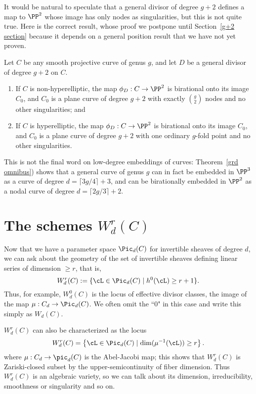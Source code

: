 It would be natural to speculate that a general divisor of degree $g+2$ defines a map to $\PP^2$ whose
image has only nodes as singularities, but this is not quite true. Here is the correct result,
whose proof we postpone until Section~\ref{g+2 section} because it depends on a general position result that we have not yet proven.

\begin{theorem}[$g+2$ theorem]\label{g+2 theorem}
Let $C$ be any smooth projective curve of genus $g$, and let $D$ be a general divisor of degree $g+2$ on $C$. 
\begin{enumerate}
\item If $C$ is non-hyperelliptic, the map $\phi_D : C \to \PP^2$ is birational onto its image $C_0$, and $C_0$ is a plane curve of degree $g+2$ with exactly $\binom{g}{2}$ nodes and no other singularities; and
\item If $C$ is hyperelliptic, the map $\phi_D : C \to \PP^2$ is birational onto its image $C_0$, and $C_0$ is a plane curve of degree $g+2$ with one ordinary $g$-fold point and no other singularities.
\end{enumerate}
\end{theorem}

This is not the final word on low-degree embeddings of curves: Theorem~\ref{grd omnibus}) shows that a general curve of genus $g$ can in fact be embedded in $\PP^{3}$ as a curve of degree $d = \lceil 3g/4 \rceil + 3$, and can be birationally embedded in $\PP^2$ as a nodal curve of degree $d = \lceil 2g/3 \rceil + 2$.

\section{The schemes $W^r_d(C)$}

Now that we have a parameter space $\Pic_d(C)$ for invertible sheaves of degree $d$, we can ask about the geometry of the set of invertible sheaves defining linear series of dimension $\geq r$, that is,
$$
W^r_d(C) := \{ \cL \in \Pic_d(C) \mid h^0(\cL) \geq r+1 \}.
$$
Thus, for example, $W^0_d(C)$ is the locus of effective divisor classes, the image of the map $\mu : C_d \to \Pic_d(C)$. We often omit the ``0" in this case and write this simply as $W_d(C)$.

$W^r_d(C)$ can also be characterized as the locus
$$
W^r_d(C) = \left\{ \cL \in \Pic_d(C) \mid \dim(\mu^{-1}(\cL)) \geq r \right\}.
$$
where $\mu : C_d \to \pic_d(C)$ is the Abel-Jacobi map; this shows that $W^r_d(C)$ is Zariski-closed subset by the upper-semicontinuity of fiber dimension.
Thus $W^r_d(C)$ is an algebraic variety, so we can talk about its dimension, irreducibility, smoothness or singularity and so on.

